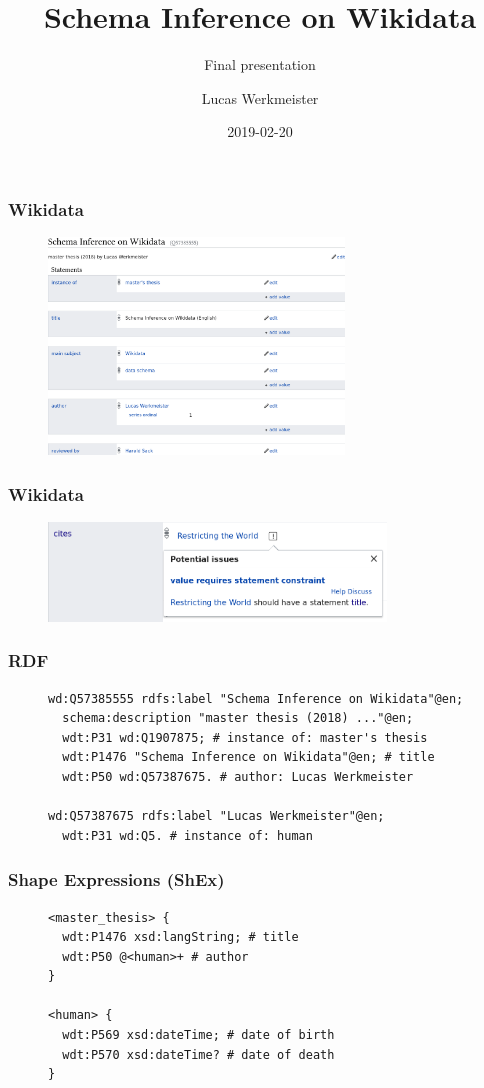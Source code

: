 \documentclass[aspectratio=169]{beamer}
\title{Schema Inference on Wikidata}
\subtitle{Final presentation}
\author{Lucas Werkmeister}
\date{2019-02-20}
\begin{document}
\frame{\titlepage}

\begin{frame}
  \frametitle{Wikidata}
  \begin{figure}
    \includegraphics[width=0.7\textwidth]{item}
  \end{figure}
\end{frame}

\begin{frame}
  \frametitle{Wikidata}
  \begin{figure}
    \includegraphics[width=0.8\textwidth]{constraint}
  \end{figure}
\end{frame}

\begin{frame}[fragile]
  \frametitle{RDF}
  \begin{figure}
    \begin{lstlisting}[language=sparql]
wd:Q57385555 rdfs:label "Schema Inference on Wikidata"@en;
  schema:description "master thesis (2018) ..."@en;
  wdt:P31 wd:Q1907875; # instance of: master's thesis
  wdt:P1476 "Schema Inference on Wikidata"@en; # title
  wdt:P50 wd:Q57387675. # author: Lucas Werkmeister

wd:Q57387675 rdfs:label "Lucas Werkmeister"@en;
  wdt:P31 wd:Q5. # instance of: human
    \end{lstlisting}
  \end{figure}
\end{frame}

\begin{frame}[fragile]
  \frametitle{Shape Expressions (ShEx)}
  \begin{figure}
    \begin{lstlisting}[language=sparql]
<master_thesis> {
  wdt:P1476 xsd:langString; # title
  wdt:P50 @<human>+ # author
}

<human> {
  wdt:P569 xsd:dateTime; # date of birth
  wdt:P570 xsd:dateTime? # date of death
}
    \end{lstlisting}
  \end{figure}
\end{frame}
\end{document}
